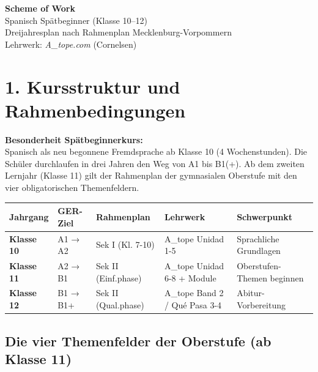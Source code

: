 \documentclass[11pt, a4paper]{article}
\begin{document}
\begin{center}
    {\LARGE\bfseries Scheme of Work}\\[6pt]
    {\Large Spanisch Spätbeginner (Klasse 10--12)}\\[8pt]
    {\normalsize Dreijahresplan nach Rahmenplan Mecklenburg-Vorpommern}\\[4pt]
    {\small Lehrwerk: \textit{A\_tope.com} (Cornelsen)}
\end{center}

\vspace{10pt}


\section*{1. Kursstruktur und Rahmenbedingungen}

\begin{infobox}
\textbf{Besonderheit Spätbeginnerkurs:}\\[4pt]
Spanisch als neu begonnene Fremdsprache ab Klasse 10 (4 Wochenstunden). Die Schüler durchlaufen in drei Jahren den Weg von A1 bis B1(+). Ab dem zweiten Lernjahr (Klasse 11) gilt der Rahmenplan der gymnasialen Oberstufe mit den vier obligatorischen Themenfeldern.
\end{infobox}

\begin{tabularx}{\textwidth}{|L{2.5cm}|C{2cm}|C{2cm}|X|L{3cm}|}
\hline
{}
\textbf{Jahrgang} & \textbf{GER-Ziel} & \textbf{Rahmenplan} & \textbf{Lehrwerk} & \textbf{Schwerpunkt} \\
\hline
\textcolor{jahr10}{\textbf{Klasse 10}} & A1 → A2 & Sek I (Kl. 7-10) & A\_tope Unidad 1-5 & Sprachliche Grundlagen \\
\hline
\textcolor{jahr11}{\textbf{Klasse 11}} & A2 → B1 & Sek II (Einf.phase) & A\_tope Unidad 6-8 + Module & Oberstufen-Themen beginnen \\
\hline
\textcolor{jahr12}{\textbf{Klasse 12}} & B1 → B1+ & Sek II (Qual.phase) & A\_tope Band 2 / Qué Pasa 3-4 & Abitur-Vorbereitung \\
\hline
\end{tabularx}

\vspace{8pt}

\subsection*{Die vier Themenfelder der Oberstufe (ab Klasse 11)}
\end{document}
